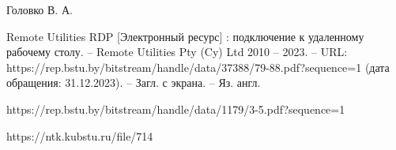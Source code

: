 \documentclass[bachelor, och, referat]{template}
\begin{document}
\begin{thebibliography}{15}
    Головко В. А. 

    Remote Utilities RDP [Электронный ресурс] : подключение к удаленному рабочему столу. --  
    Remote Utilities Pty (Cy) Ltd 2010 -- 2023. -- URL:  https://rep.bstu.by/bitstream/handle/data/37388/79-88.pdf?sequence=1 (дата обращения: 31.12.2023). -- Загл. с экрана. -- Яз. англ.
    
    https://rep.bstu.by/bitstream/handle/data/1179/3-5.pdf?sequence=1

    https://ntk.kubstu.ru/file/714


\end{thebibliography}
\end{document}
